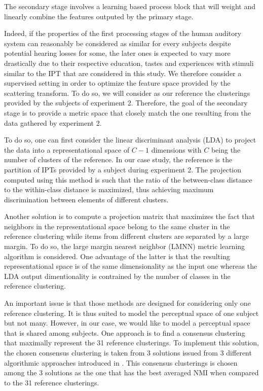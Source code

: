 \documentclass{article}
\newcommand{\ipt}{IPT\xspace}
\newcommand{\ipts}{IPTs\xspace}
\begin{document}
The secondary stage involves a learning based process block that will weight and linearly combine the features outputed by the primary stage.

Indeed, if the properties of the first processing stages of the human auditory system can reasonably be considered as similar for every subjects despite potential hearing losses for some, the later ones is expected to vary more drastically due to their respective education, tastes and experiences with stimuli similar to the \ipt that are considered in this study. We therefore consider a supervised setting in order to optimize the feature space provided by the scattering transform. To do so, we will consider as our reference the clusterings provided by the subjects of experiment 2. Therefore, the goal of the secondary stage is to provide a metric space that closely match the one resulting from the data gathered by experiment 2.

To do so, one can first consider the linear discriminant analysis (LDA) \cite{duda2000pattern} to project the data into a representational space of $C-1$ dimensions with $C$ being the number of clusters of the reference. In our case study, the reference is the partition of \ipts provided by a subject during experiment 2. The projection computed using this method is such that the ratio of the between-class distance to the within-class distance is maximized, thus achieving maximum discrimination between elements of different clusters.

Another solution is to compute a projection matrix that maximizes the fact that neighbors in the representational space belong to the same cluster in the reference clustering while items from different clusters are separated by a large margin. To do so, the large margin nearest neighbor (LMNN) metric learning algorithm \cite{weinberger2006distance, weinberger2009distance} is considered. One advantage of the latter is that the resulting representational space is of the same dimensionality as the input one whereas the LDA output dimentionality is contrained by the number of classes in the reference clustering.

An important issue is that those methods are designed for considering only one reference clustering. It is thus suited to model the perceptual space of one subject but not many. However, in our case, we would like to model a perceptual space that is shared among subjects. One approach is to find a consensus clustering that maximally represent the 31 reference clusterings. To implement this solution, the chosen consensus clustering is taken from 3 solutions issued from 3 different algorithmic approaches introduced in \cite{strehl2002cluster}. This consensus clusterings is chosen among the 3 solutions as the one that has the best averaged NMI when compared to the 31 reference clusterings.
\end{document}
